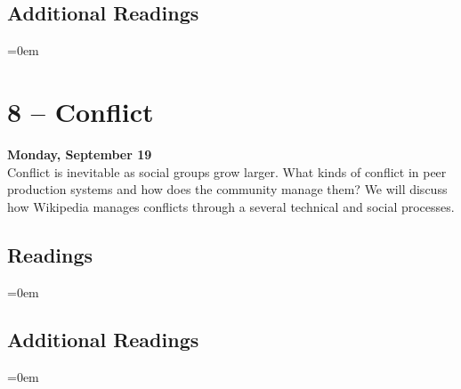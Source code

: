 \documentclass[10pt]{memoir}
\newenvironment{readinglist}{
\begin{list}{}{\leftmargin=8pt \itemindent=0em}
  \setlength{\itemsep}{8pt}
  \setlength{\parskip}{0em}
  \setlength{\parsep}{1em}
  \setlength{\parindent}{8em}}
{\end{list}}
\begin{document}
    \subsection{Additional Readings}
    \begin{readinglist}
        \item {}
        \item {}
        \item {}
        \item {}
        \item {}
        \item {}
        \item {}
    \end{readinglist}


\section{8 -- Conflict}
\textcolor{CUGold}{\textbf{Monday, September 19}}\\
Conflict is inevitable as social groups grow larger. What kinds of conflict in peer production systems and how does the community manage them? We will discuss how Wikipedia manages conflicts through a several technical and social processes.

    \subsection{Readings}
    \begin{readinglist}
        \item {}
        \item {}
    \end{readinglist}
    
    \subsection{Additional Readings}
    \begin{readinglist}
        \item {}
        \item {}
        \item {}
        \item {}
        \item {}
        \item {}
        \item {}
        \item {}
    \end{readinglist}
\end{document}
